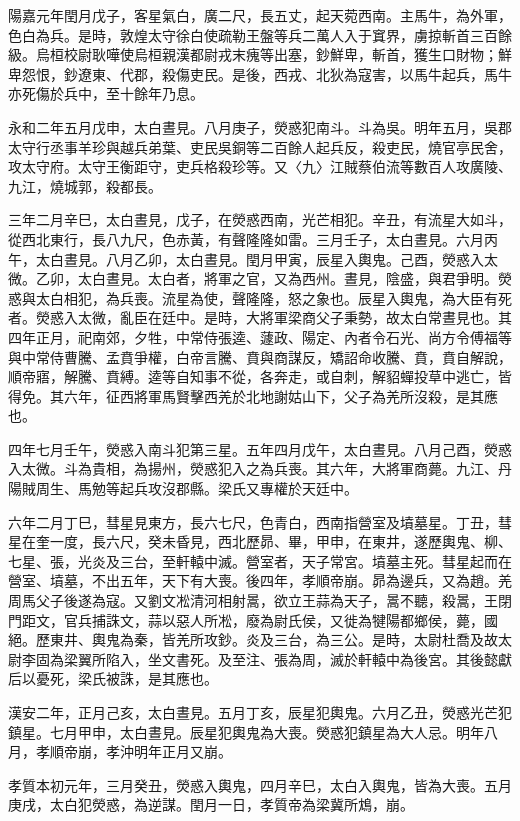 \begin{pinyinscope}
陽嘉元年閏月戊子，客星氣白，廣二尺，長五丈，起天菀西南。主馬牛，為外軍，色白為兵。是時，敦煌太守徐白使疏勒王盤等兵二萬人入于窴界，虜掠斬首三百餘級。烏桓校尉耿嘩使烏桓親漢都尉戎末瘣等出塞，鈔鮮卑，斬首，獲生口財物；鮮卑怨恨，鈔遼東、代郡，殺傷吏民。是後，西戎、北狄為寇害，以馬牛起兵，馬牛亦死傷於兵中，至十餘年乃息。

永和二年五月戊申，太白晝見。八月庚子，熒惑犯南斗。斗為吳。明年五月，吳郡太守行丞事羊珍與越兵弟葉、吏民吳銅等二百餘人起兵反，殺吏民，燒官亭民舍，攻太守府。太守王衡距守，吏兵格殺珍等。又〈九〉江賊蔡伯流等數百人攻廣陵、九江，燒城郭，殺都長。

三年二月辛巳，太白晝見，戊子，在熒惑西南，光芒相犯。辛丑，有流星大如斗，從西北東行，長八九尺，色赤黃，有聲隆隆如雷。三月壬子，太白晝見。六月丙午，太白晝見。八月乙卯，太白晝見。閏月甲寅，辰星入輿鬼。己酉，熒惑入太微。乙卯，太白晝見。太白者，將軍之官，又為西州。晝見，陰盛，與君爭明。熒惑與太白相犯，為兵喪。流星為使，聲隆隆，怒之象也。辰星入輿鬼，為大臣有死者。熒惑入太微，亂臣在廷中。是時，大將軍梁商父子秉勢，故太白常晝見也。其四年正月，祀南郊，夕牲，中常侍張逵、蘧政、陽定、內者令石光、尚方令傅福等與中常侍曹騰、孟賁爭權，白帝言騰、賁與商謀反，矯詔命收騰、賁，賁自解說，順帝寤，解騰、賁縛。逵等自知事不從，各奔走，或自刺，解貂蟬投草中逃亡，皆得免。其六年，征西將軍馬賢擊西羌於北地謝姑山下，父子為羌所沒殺，是其應也。

四年七月壬午，熒惑入南斗犯第三星。五年四月戊午，太白晝見。八月己酉，熒惑入太微。斗為貴相，為揚州，熒惑犯入之為兵喪。其六年，大將軍商薨。九江、丹陽賊周生、馬勉等起兵攻沒郡縣。梁氏又專權於天廷中。

六年二月丁巳，彗星見東方，長六七尺，色青白，西南指營室及墳墓星。丁丑，彗星在奎一度，長六尺，癸未昏見，西北歷昴、畢，甲申，在東井，遂歷輿鬼、柳、七星、張，光炎及三台，至軒轅中滅。營室者，天子常宮。墳墓主死。彗星起而在營室、墳墓，不出五年，天下有大喪。後四年，孝順帝崩。昴為邊兵，又為趙。羌周馬父子後遂為寇。又劉文凇清河相射暠，欲立王蒜為天子，暠不聽，殺暠，王閉門距文，官兵捕誅文，蒜以惡人所凇，廢為尉氏侯，又徙為犍陽都鄉侯，薨，國絕。歷東井、輿鬼為秦，皆羌所攻鈔。炎及三台，為三公。是時，太尉杜喬及故太尉李固為梁翼所陷入，坐文書死。及至注、張為周，滅於軒轅中為後宮。其後懿獻后以憂死，梁氏被誅，是其應也。

漢安二年，正月己亥，太白晝見。五月丁亥，辰星犯輿鬼。六月乙丑，熒惑光芒犯鎮星。七月甲申，太白晝見。辰星犯輿鬼為大喪。熒惑犯鎮星為大人忌。明年八月，孝順帝崩，孝沖明年正月又崩。

孝質本初元年，三月癸丑，熒惑入輿鬼，四月辛巳，太白入輿鬼，皆為大喪。五月庚戌，太白犯熒惑，為逆謀。閏月一日，孝質帝為梁冀所鴆，崩。


\end{pinyinscope}